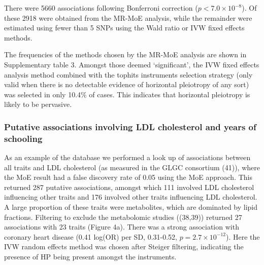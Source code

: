 \documentclass[]{article}
\begin{document}
There were 5660 associations following Bonferroni correction
(\(p < 7.0 \times 10^{-8}\)). Of these 2918 were obtained from the
MR-MoE analysis, while the remainder were estimated using fewer than 5
SNPs using the Wald ratio or IVW fixed effects methods.

The frequencies of the methods chosen by the MR-MoE analysis are shown
in Supplementary table 3. Amongst those deemed `significant', the IVW
fixed effects analysis method combined with the tophits instruments
selection strategy (only valid when there is no detectable evidence of
horizontal pleiotropy of any sort) was selected in only 10.4\% of cases.
This indicates that horizontal pleiotropy is likely to be pervasive.

\subsubsection{Putative associations involving LDL cholesterol and years
of
schooling}\label{putative-associations-involving-ldl-cholesterol-and-years-of-schooling}

As an example of the database we performed a look up of associations
between all traits and LDL cholesterol (as measured in the GLGC
consortium (41)), where the MoE result had a false discovery rate of
0.05 using the MoE approach. This returned 287 putative associations,
amongst which 111 involved LDL cholesterol influencing other traits and
176 involved other traits influencing LDL cholesterol. A large
proportion of these traits were metabolites, which are dominated by
lipid fractions. Filtering to exclude the metabolomic studies ((38,39))
returned 27 associations with 23 traits (Figure 4a). There was a strong
association with coronary heart disease (0.41 log(OR) per SD, 0.31-0.52,
\(p=2.7\times10^{-12}\)). Here the IVW random effects method was chosen
after Steiger filtering, indicating the presence of HP being present
amongst the instruments.
\end{document}
